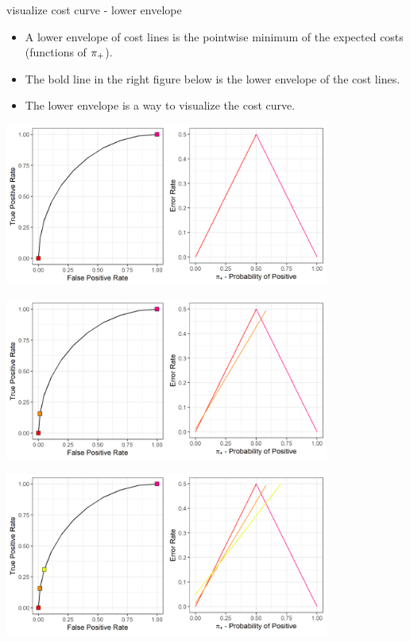 \begin{frame}{visualize cost curve - lower envelope}
	
	\begin{itemize}
		\item A lower envelope of cost lines is the pointwise minimum of the expected costs (functions of $\pi_{+}$).
		\item The bold line in the right figure below is the lower envelope of the cost lines.
		\item The lower envelope is a way to visualize the cost curve.
	\end{itemize}
   {
    \begin{center}
      \includegraphics[width=0.8\textwidth]{figure/lower_envelope_1.png}
    \end{center}  
  }
   {
    \begin{center}
      \includegraphics[width=0.8\textwidth]{figure/lower_envelope_2.png}
    \end{center}  
  }
   {
    \begin{center}
      \includegraphics[width=0.8\textwidth]{figure/lower_envelope_3.png}

\end{center}}
\end{frame}
